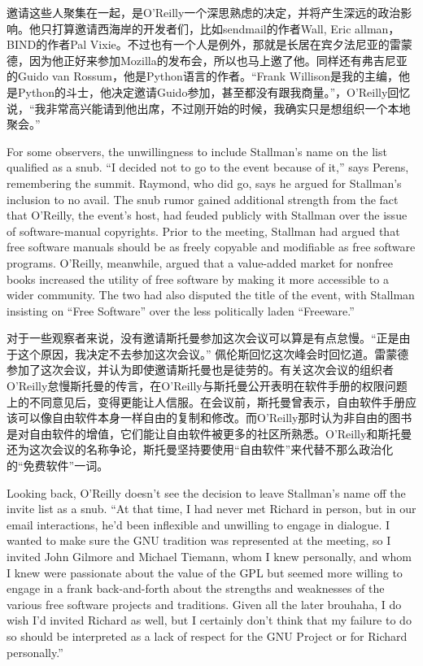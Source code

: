 \ifdefined\chs
邀请这些人聚集在一起，是O'Reilly一个深思熟虑的决定，并将产生深远的政治影响。他只打算邀请西海岸的开发者们，比如sendmail的作者Wall, Eric allman，BIND的作者Pal Vixie。不过也有一个人是例外，那就是长居在宾夕法尼亚的雷蒙德，因为他正好来参加Mozilla的发布会，所以也马上邀了他。同样还有弗吉尼亚的Guido van Rossum，他是Python语言的作者。“Frank Willison是我的主编，他是Python的斗士，他决定邀请Guido参加，甚至都没有跟我商量。”，O'Reilly回忆说，“我非常高兴能请到他出席，不过刚开始的时候，我确实只是想组织一个本地聚会。”
\fi

\ifdefined\eng
For some observers, the unwillingness to include Stallman's name on the list qualified as a snub. ``I decided not to go to the event because of it,'' says Perens, remembering the summit. Raymond, who did go, says he argued for Stallman's inclusion to no avail. The snub rumor gained additional strength from the fact that O'Reilly, the event's host, had feuded publicly with Stallman over the issue of software-manual copyrights. Prior to the meeting, Stallman had argued that free software manuals should be as freely copyable and modifiable as free software programs. O'Reilly, meanwhile, argued that a value-added market for nonfree books increased the utility of free software by making it more accessible to a wider community. The two had also disputed the title of the event, with Stallman insisting on ``Free Software'' over the less politically laden ``Freeware.''
\fi

\ifdefined\chs
对于一些观察者来说，没有邀请斯托曼参加这次会议可以算是有点怠慢。“正是由于这个原因，我决定不去参加这次会议。” 佩伦斯回忆这次峰会时回忆道。雷蒙德参加了这次会议，并认为即使邀请斯托曼也是徒劳的。有关这次会议的组织者O'Reilly怠慢斯托曼的传言，在O'Reilly与斯托曼公开表明在软件手册的权限问题上的不同意见后，变得更能让人信服。在会议前，斯托曼曾表示，自由软件手册应该可以像自由软件本身一样自由的复制和修改。而O'Reilly那时认为非自由的图书是对自由软件的增值，它们能让自由软件被更多的社区所熟悉。O'Reilly和斯托曼还为这次会议的名称争论，斯托曼坚持要使用“自由软件”来代替不那么政治化的“免费软件”一词。
\fi

\ifdefined\eng
Looking back, O'Reilly doesn't see the decision to leave Stallman's name off the invite list as a snub. ``At that time, I had never met Richard in person, but in our email interactions, he'd been inflexible and unwilling to engage in dialogue. I wanted to make sure the GNU tradition was represented at the meeting, so I invited John Gilmore and Michael Tiemann, whom I knew personally, and whom I knew were passionate about the value of the GPL but seemed more willing to engage in a frank back-and-forth about the strengths and weaknesses of the various free software projects and traditions. Given all the later brouhaha, I do wish I'd invited Richard as well, but I certainly don't think that my failure to do so should be interpreted as a lack of respect for the GNU Project or for Richard personally.''
\fi

